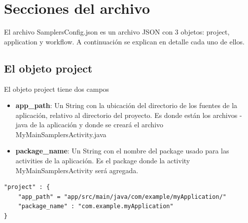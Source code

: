 \section{Secciones del archivo} \label{sec:archivo_config_detallado}

El archivo SamplersConfig.json es un archivo JSON con 3 objetos: project, application y workflow. A continuación se explican en detalle cada uno de ellos.

\subsection{El objeto project}
		
	El objeto project tiene dos campos
	\begin{itemize}
		\item \textbf{app\_path}: Un String con la ubicación del directorio de los fuentes de la aplicación, relativo al directorio del proyecto. Es donde están los archivos -java de la aplicación y donde se creará el archivo MyMainSamplersActivity.java
		\item \textbf{package\_name}: Un String con el nombre del package usado para las activities de la aplicación. Es el package donde la activity MyMainSamplersActivity será agregada.
	\end{itemize}
	

\begin{lstlisting}[language=XML, frame=tlbr, caption=Ejemplo del objeto project.]	
"project" : {
	"app_path" = "app/src/main/java/com/example/myApplication/"
	"package_name" : "com.example.myApplication"
}
\end{lstlisting}

	

